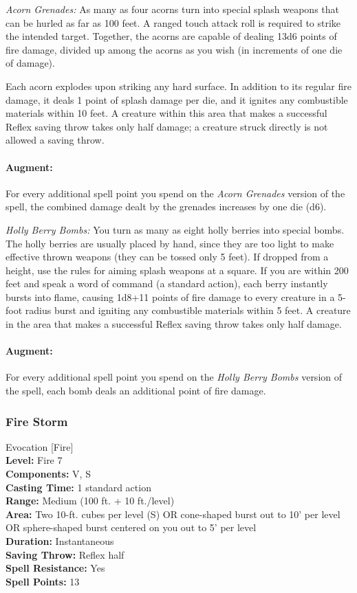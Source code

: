 \begin{list}{}{\leftmargin=1em}
 \item \emph{Acorn Grenades:} As many as four acorns turn into special splash weapons that can be hurled as far as 100 feet. A ranged touch attack roll is required to strike the intended target. Together, the acorns are capable of dealing 13d6 points of fire damage, divided up among the acorns as you wish (in increments of one die of damage).

Each acorn explodes upon striking any hard surface. In addition to its regular fire damage, it deals 1 point of splash damage per die, and it ignites any combustible materials within 10 feet. A creature within this area that makes a successful Reflex saving throw takes only half damage; a creature struck directly is not allowed a saving throw.
\paragraph{Augment:} For every additional spell point you spend on the \emph{Acorn Grenades} version of the spell, the combined damage dealt by the grenades increases by one die (d6).
 \item \emph{Holly Berry Bombs:} You turn as many as eight holly berries into special bombs. 
The holly berries are usually placed by hand, since they are too light to make effective thrown weapons (they can be tossed only 5 feet). If dropped from a height, use the rules for aiming splash weapons at a square. If you are within 200 feet and speak a word of command (a standard action), each berry instantly bursts into flame, causing 1d8+11 points of fire damage to every creature in a 5-foot radius burst and igniting any combustible materials within 5 feet. A creature in the area that makes a successful Reflex saving throw takes only half damage.
\paragraph{Augment:} For every additional spell point you spend on the \emph{Holly Berry Bombs} version of the spell, each bomb deals an additional point of fire damage.
\end{list}
\subsubsection{Fire Storm}
\label{Spell:FireStorm}
Evocation [Fire]
\\ \textbf{Level:} Fire 7
\\ \textbf{Components:} V, S
\\ \textbf{Casting Time:} 1 standard action
\\ \textbf{Range:} Medium (100 ft. + 10 ft./level)
\\ \textbf{Area:} Two 10-ft. cubes per level (S) OR cone-shaped burst out to 10' per level OR sphere-shaped burst centered on you out to 5' per level
\\ \textbf{Duration:} Instantaneous
\\ \textbf{Saving Throw:} Reflex half
\\ \textbf{Spell Resistance:} Yes
\\ \textbf{Spell Points:} 13

